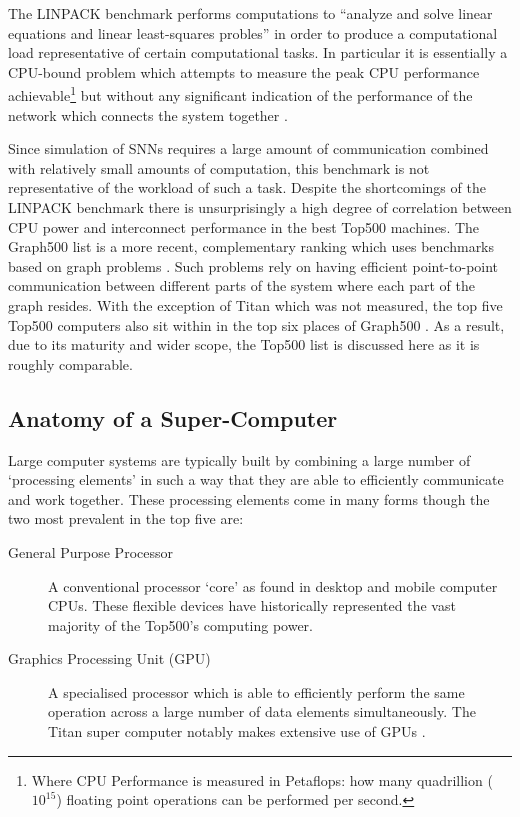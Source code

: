 		The LINPACK benchmark performs computations to ``analyze and solve linear
		equations and linear least-squares probles'' \cite{dongarra84} in order to
		produce a computational load representative of certain computational tasks.
		In particular it is essentially a CPU-bound problem which attempts to
		measure the peak CPU performance achievable\footnote{Where CPU Performance
		is measured in Petaflops: how many quadrillion ($10^{15}$) floating point
		operations can be performed per second.} but without any significant
		indication of the performance of the network which connects the system
		together \cite{dongarra07}.
		
		Since simulation of SNNs requires a large amount of communication combined
		with relatively small amounts of computation, this benchmark is not
		representative of the workload of such a task. Despite the shortcomings of
		the LINPACK benchmark there is unsurprisingly a high degree of correlation
		between CPU power and interconnect performance in the best Top500 machines.
		The Graph500 list is a more recent, complementary ranking which uses
		benchmarks based on graph problems \cite{murphy10}. Such problems rely on
		having efficient point-to-point communication between different parts of the
		system where each part of the graph resides. With the exception of Titan
		which was not measured, the top five Top500 computers also sit within in the
		top six places of Graph500 \cite{murphy13}. As a result, due to its maturity
		and wider scope, the Top500 list is discussed here as it is roughly
		comparable.
		
		\subsection{Anatomy of a Super-Computer}
			
			
			Large computer systems are typically built by combining a large number of
			`processing elements' in such a way that they are able to efficiently
			communicate and work together. These processing elements come in many
			forms though the two most prevalent in the top five are:
			
			\begin{description}
				
				\item[General Purpose Processor] A conventional processor `core' as
				found in desktop and mobile computer CPUs. These flexible devices have
				historically represented the vast majority of the Top500's computing
				power.
				
				\item[Graphics Processing Unit (GPU)] A specialised processor which is
				able to efficiently perform the same operation across a large number of
				data elements simultaneously. The Titan super computer notably makes
				extensive use of GPUs \cite{bland12}.
				
			\end{description}
			
